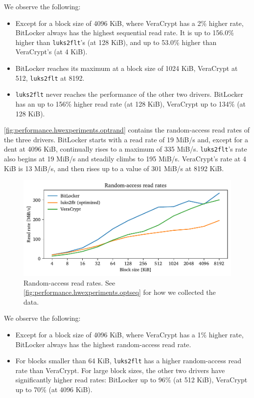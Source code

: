 We observe the following:
\begin{itemize}[beginpenalty=10000]
	\item Except for a block size of 4096 KiB, where VeraCrypt has a 2\% higher rate, BitLocker always has the highest sequential read rate. It is up to 156.0\% higher than \texttt{luks2flt}'s (at 128 KiB), and up to 53.0\% higher than VeraCrypt's (at 4 KiB).
	\item BitLocker reaches its maximum at a block size of 1024 KiB, VeraCrypt at 512, \texttt{luks2flt} at 8192.
	\item \texttt{luks2flt} never reaches the performance of the other two drivers. BitLocker has an up to 156\% higher read rate (at 128 KiB), VeraCrypt up to 134\% (at 128 KiB).
\end{itemize}

\autoref{fig:performance.hwexperiments.optrand} contains the random-access read rates of the three drivers. BitLocker starts with a read rate of 19 MiB/s and, except for a dent at 4096 KiB, continually rises to a maximum of 335 MiB/s. \texttt{luks2flt}'s rate also begins at 19 MiB/s and steadily climbs to 195 MiB/s. VeraCrypt's rate at 4 KiB is 13 MiB/s, and then rises up to a value of 301 MiB/s at 8192 KiB. 

\begin{figure}[htb!]
	\center
	\includegraphics[scale=1]{../fig/performance.hwexperiments.optrand.pdf}
	\caption[
		Random-access read rates
	]{
		Random-access read rates. See \autoref{fig:performance.hwexperiments.optseq} for how we collected the data.
	}
	\label{fig:performance.hwexperiments.optrand}
\end{figure}

We observe the following:
\begin{itemize}[beginpenalty=10000]
	\item Except for a block size of 4096 KiB, where VeraCrypt has a 1\% higher rate, BitLocker always has the highest random-access read rate.
	\item For blocks smaller than 64 KiB, \texttt{luks2flt} has a higher random-access read rate than VeraCrypt. For large block sizes, the other two drivers have significantly higher read rates: BitLocker up to 96\% (at 512 KiB), VeraCrypt up to 70\% (at 4096 KiB).
\end{itemize}

